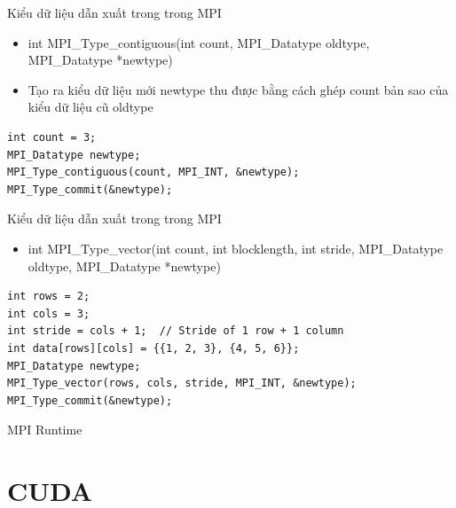 \documentclass[10pt]{beamer}
\theoremstyle{remark}
\numberwithin{algocf}{section}
\numberwithin{equation}{section}
\numberwithin{dl}{section}
\numberwithin{figure}{section}
\begin{document}
\begin{frame}[fragile]{Kiểu dữ liệu dẫn xuất trong trong MPI}
    \begin{itemize}
        \item int MPI\_Type\_contiguous(int count, MPI\_Datatype oldtype,
                                        MPI\_Datatype *newtype)
        \item Tạo ra kiểu dữ liệu mới newtype thu được bằng cách ghép count bản sao của kiểu dữ liệu cũ oldtype
       
    \end{itemize}
    \begin{verbatim}
int count = 3;
MPI_Datatype newtype;
MPI_Type_contiguous(count, MPI_INT, &newtype);
MPI_Type_commit(&newtype);
    \end{verbatim}
\end{frame}

\begin{frame}[fragile]{Kiểu dữ liệu dẫn xuất trong trong MPI}
    \begin{itemize}
        \item int MPI\_Type\_vector(int count, int blocklength, int stride,
                                    MPI\_Datatype oldtype,
                                    MPI\_Datatype *newtype)
    \end{itemize}

    \begin{verbatim}
int rows = 2;
int cols = 3;
int stride = cols + 1;  // Stride of 1 row + 1 column
int data[rows][cols] = {{1, 2, 3}, {4, 5, 6}};
MPI_Datatype newtype;
MPI_Type_vector(rows, cols, stride, MPI_INT, &newtype);
MPI_Type_commit(&newtype);
    \end{verbatim}
\end{frame}

\begin{frame}{MPI Runtime}
    
\end{frame}

\section{CUDA}
\end{document}
